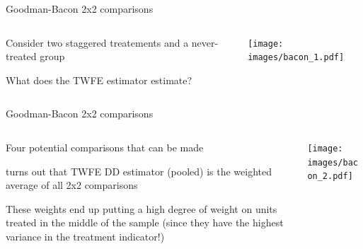 \documentclass[notes,11pt, aspectratio=169]{beamer}
\newenvironment{wideitemize}{\itemize\addtolength{\itemsep}{10pt}}{\enditemize}
\begin{document}
\begin{frame}{Goodman-Bacon 2x2 comparisons}
  \begin{columns}[T] %
    \begin{column}{0.4\textwidth}
      \begin{wideitemize}
      \item  Consider two staggered treatements and a never-treated group
      \item What does the TWFE estimator estimate?
      \end{wideitemize}
    \end{column}%
    \hfill%
    \begin{column}{.6\textwidth}
      \texttt{[image: images/bacon\_1.pdf]}
    \end{column}%
  \end{columns}
\end{frame}
\begin{frame}{Goodman-Bacon 2x2 comparisons}
  \begin{columns}[T] %
    \begin{column}{0.4\textwidth}
      \begin{wideitemize}
      \item Four potential comparisons that can be made
      \item turns out that TWFE DD estimator (pooled) is the 
        weighted average of all 2x2 comparisons
      \item These weights end up putting a high degree of weight on
        units treated in the middle of the sample (since they have the
        highest variance in the treatment indicator!)
      \end{wideitemize}
    \end{column}%
    \hfill%
    \begin{column}{.6\textwidth}
      \texttt{[image: images/bacon\_2.pdf]}
    \end{column}%
  \end{columns}
\end{frame}
\end{document}
